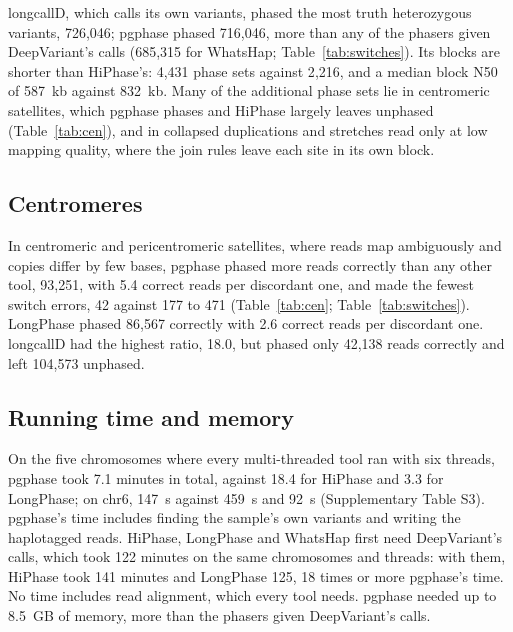 longcallD, which calls its own variants, phased the most truth heterozygous variants, 726{,}046; pgphase phased 716{,}046, more than any of the phasers given DeepVariant's calls (685{,}315 for WhatsHap; Table~\ref{tab:switches}). Its blocks are shorter than HiPhase's: 4{,}431 phase sets against 2{,}216, and a median block N50 of 587~kb against 832~kb. Many of the additional phase sets lie in centromeric satellites, which pgphase phases and HiPhase largely leaves unphased (Table~\ref{tab:cen}), and in collapsed duplications and stretches read only at low mapping quality, where the join rules leave each site in its own block.

\subsection{Centromeres}

In centromeric and pericentromeric satellites, where reads map ambiguously and copies differ by few bases, pgphase phased more reads correctly than any other tool, 93{,}251, with 5.4 correct reads per discordant one, and made the fewest switch errors, 42 against 177 to 471 (Table~\ref{tab:cen}; Table~\ref{tab:switches}). LongPhase phased 86{,}567 correctly with 2.6 correct reads per discordant one. longcallD had the highest ratio, 18.0, but phased only 42{,}138 reads correctly and left 104{,}573 unphased.



\subsection{Running time and memory}

On the five chromosomes where every multi-threaded tool ran with six threads, pgphase took 7.1 minutes in total, against 18.4 for HiPhase and 3.3 for LongPhase; on chr6, 147~s against 459~s and 92~s (Supplementary Table S3). pgphase's time includes finding the sample's own variants and writing the haplotagged reads. HiPhase, LongPhase and WhatsHap first need DeepVariant's calls, which took 122 minutes on the same chromosomes and threads: with them, HiPhase took 141 minutes and LongPhase 125, 18 times or more pgphase's time. No time includes read alignment, which every tool needs. pgphase needed up to 8.5~GB of memory, more than the phasers given DeepVariant's calls.
